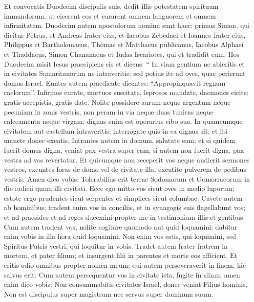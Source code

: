 \begin{biblechapter}
\begin{biblechapter}
\begin{biblechapter}
\begin{biblechapter}
\begin{biblechapter}
\begin{biblechapter}
\begin{biblechapter}
\begin{biblechapter}
\begin{biblechapter}
\begin{biblechapter}
\verse Et convocatis Duodecim discipulis suis, dedit illis potestatem spirituum immundorum, ut eicerent eos et curarent omnem languorem et omnem infirmitatem.
 \verse Duodecim autem apostolorum nomina sunt haec: primus Simon, qui dicitur Petrus, et Andreas frater eius, et Iacobus Zebedaei et Ioannes frater eius, 
\verse Philippus et Bartholomaeus, Thomas et Matthaeus publicanus, Iacobus Alphaei et Thaddaeus, 
\verse Simon Chananaeus et Iudas Iscariotes, qui et tradidit eum.
 \verse Hos Duodecim misit Iesus praecipiens eis et dicens: “ In viam gentium ne abieritis et in civitates Samaritanorum ne intraveritis; 
\verse sed potius ite ad oves, quae perierunt domus Israel. 
\verse Euntes autem praedicate dicentes: “Appropinquavit regnum caelorum”.
 \verse Infirmos curate, mortuos suscitate, leprosos mundate, daemones eicite; gratis accepistis, gratis date. 
\verse Nolite possidere aurum neque argentum neque pecuniam in zonis vestris, 
\verse non peram in via neque duas tunicas neque calceamenta neque virgam; dignus enim est operarius cibo suo.
 \verse In quamcumque civitatem aut castellum intraveritis, interrogate quis in ea dignus sit; et ibi manete donec exeatis. 
\verse Intrantes autem in domum, salutate eam; 
\verse et si quidem fuerit domus digna, veniat pax vestra super eam; si autem non fuerit digna, pax vestra ad vos revertatur. 
\verse Et quicumque non receperit vos neque audierit sermones vestros, exeuntes foras de domo vel de civitate illa, excutite pulverem de pedibus vestris. 
\verse Amen dico vobis: Tolerabilius erit terrae Sodomorum et Gomorraeorum in die iudicii quam illi civitati.
 \verse Ecce ego mitto vos sicut oves in medio luporum; estote ergo prudentes sicut serpentes et simplices sicut columbae. 
\verse Cavete autem ab hominibus; tradent enim vos in conciliis, et in synagogis suis flagellabunt vos; 
\verse et ad praesides et ad reges ducemini propter me in testimonium illis et gentibus. 
 \verse Cum autem tradent vos, nolite cogitare quomodo aut quid loquamini; dabitur enim vobis in illa hora quid loquamini. 
\verse Non enim vos estis, qui loquimini, sed Spiritus Patris vestri, qui loquitur in vobis.
 \verse Tradet autem frater fratrem in mortem, et pater filium; et insurgent filii in parentes et morte eos afficient. 
\verse Et eritis odio omnibus propter nomen meum; qui autem perseveraverit in finem, hic salvus erit. 
\verse Cum autem persequentur vos in civitate ista, fugite in aliam; amen enim dico vobis: Non consummabitis civitates Israel, donec veniat Filius hominis.
 \verse Non est discipulus super magistrum nec servus super dominum suum. 

\end{biblechapter}
\end{biblechapter}
\end{biblechapter}
\end{biblechapter}
\end{biblechapter}
\end{biblechapter}
\end{biblechapter}
\end{biblechapter}
\end{biblechapter}
\end{biblechapter}
